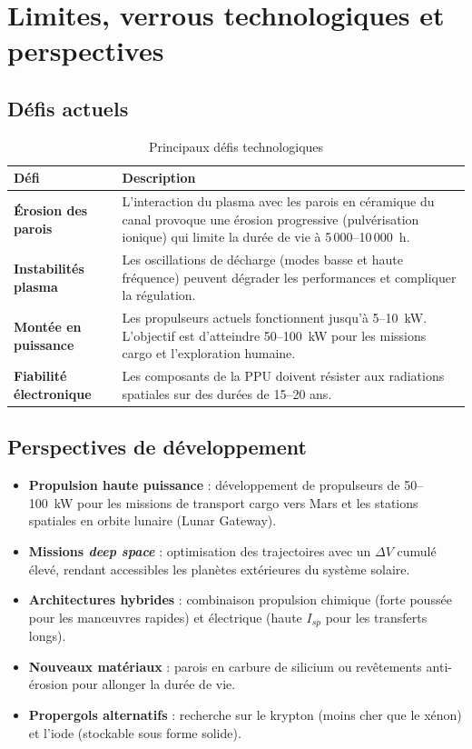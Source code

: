 \documentclass[12pt,a4paper]{article}
\begin{document}
\section{Limites, verrous technologiques et perspectives}

\subsection{Défis actuels}

\begin{table}[H]
\centering
\caption{Principaux défis technologiques}
\begin{tabular}{>{\bfseries}l p{9cm}}
\toprule
Défi & Description \\
\midrule
Érosion des parois & L'interaction du plasma avec les parois en céramique du canal provoque une érosion progressive (pulvérisation ionique) qui limite la durée de vie à 5\,000--10\,000~h. \\
Instabilités plasma & Les oscillations de décharge (modes basse et haute fréquence) peuvent dégrader les performances et compliquer la régulation. \\
Montée en puissance & Les propulseurs actuels fonctionnent jusqu'à 5--10~kW. L'objectif est d'atteindre 50--100~kW pour les missions cargo et l'exploration humaine. \\
Fiabilité électronique & Les composants de la PPU doivent résister aux radiations spatiales sur des durées de 15--20 ans. \\
\bottomrule
\end{tabular}
\end{table}

\subsection{Perspectives de développement}

\begin{itemize}
    \item \textbf{Propulsion haute puissance} : développement de propulseurs de 50--100~kW pour les missions de transport cargo vers Mars et les stations spatiales en orbite lunaire (Lunar Gateway).
    \item \textbf{Missions \textit{deep space}} : optimisation des trajectoires avec un $\Delta V$ cumulé élevé, rendant accessibles les planètes extérieures du système solaire.
    \item \textbf{Architectures hybrides} : combinaison propulsion chimique (forte poussée pour les manœuvres rapides) et électrique (haute $I_{sp}$ pour les transferts longs).
    \item \textbf{Nouveaux matériaux} : parois en carbure de silicium ou revêtements anti-érosion pour allonger la durée de vie.
    \item \textbf{Propergols alternatifs} : recherche sur le krypton (moins cher que le xénon) et l'iode (stockable sous forme solide).
\end{itemize}
\end{document}
